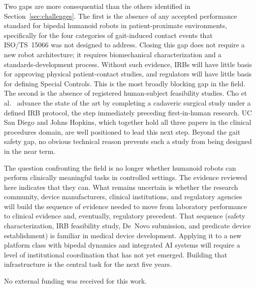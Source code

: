 \documentclass[acmsmall]{acmart}
\begin{document}
Two gaps are more consequential than the others identified in
Section~\ref{sec:challenges}. The first is the absence of any accepted performance
standard for bipedal humanoid robots in patient-proximate environments, specifically
for the four categories of gait-induced contact events that ISO/TS~15066 was not
designed to address. Closing this gap does not require a new robot architecture;
it requires biomechanical characterization and a standards-development process.
Without such evidence, IRBs will have little basis for approving physical
patient-contact studies, and regulators will have little basis for defining
Special Controls. This is the most broadly blocking gap in the field. The second
is the absence of registered
human-subject feasibility studies. Cho et al.~\cite{cho2026humanoid} advance the
state of the art by completing a cadaveric surgical study under a defined IRB
protocol, the step immediately preceding first-in-human research. UC San Diego
and Johns Hopkins, which together hold all three papers in the clinical procedures
domain, are well positioned to lead this next step. Beyond the gait safety gap,
no obvious technical reason prevents such a study from being designed in the near
term.

The question confronting the field is no longer whether humanoid robots can
perform clinically meaningful tasks in controlled settings. The evidence reviewed
here indicates that they can. What remains uncertain is whether the research
community, device manufacturers, clinical institutions, and regulatory agencies
will build the sequence of evidence needed to move from laboratory performance to
clinical evidence and, eventually, regulatory precedent. That sequence (safety
characterization, IRB feasibility study, De~Novo submission, and predicate device
establishment) is familiar in medical device development. Applying it to a new
platform class with bipedal dynamics and integrated AI systems will require a
level of institutional coordination that has not yet emerged. Building that
infrastructure is the central task for the next five years.

\begin{acks}
No external funding was received for this work.
\end{acks}



\end{document}
